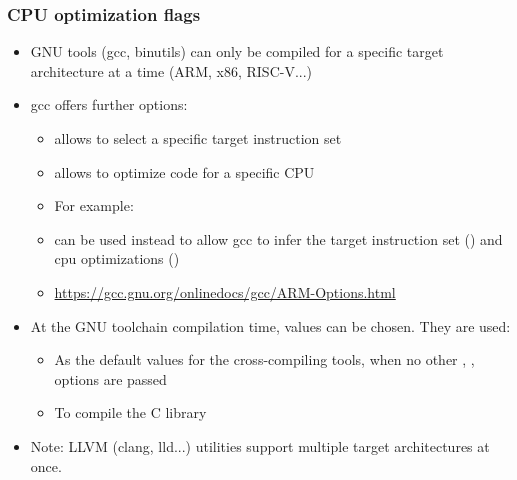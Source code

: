\begin{frame}
  \frametitle{CPU optimization flags}
  \begin{itemize}
  \item GNU tools (gcc, binutils) can only be compiled for a specific
        target architecture at a time (ARM, x86, RISC-V...)
  \item gcc offers further options:
    \begin{itemize}
    \item {} allows to select a specific target instruction set
    \item {} allows to optimize code for a specific CPU
    \item For example: 
    \item {} can be used instead to allow gcc to infer the target
      instruction set () and cpu optimizations ()
    \item \url{https://gcc.gnu.org/onlinedocs/gcc/ARM-Options.html}
    \end{itemize}
  \item At the GNU toolchain compilation time, values can be chosen. They are used:
    \begin{itemize}
    \item As the default values for the cross-compiling tools, when no
      other , ,  options are
      passed
    \item To compile the C library
    \end{itemize}
  \item Note: LLVM (clang, lld...) utilities support multiple target architectures at once.
  \end{itemize}
\end{frame}
